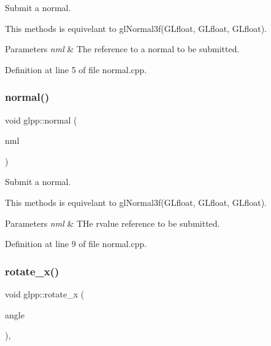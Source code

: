 Submit a normal. 

This methods is equivelant to gl\+Normal3f(\+G\+Lfloat, G\+Lfloat, G\+Lfloat).


\begin{DoxyParams}{Parameters}
{\em nml} & The reference to a normal to be submitted. \\
\hline
\end{DoxyParams}


Definition at line 5 of file normal.\+cpp.

\mbox{\label{namespaceglpp_a9a86b5d9e2e3e536e0c0f514017e943c}} 
\subsubsection{\texorpdfstring{normal()}{normal()}\hspace{0.1cm}{\footnotesize\ttfamily [2/2]}}
{\footnotesize\ttfamily void glpp\+::normal (\begin{DoxyParamCaption}\item[{const \hyperlink{namespaceglpp_a3fa7b207a8b7dba583fb22731a616d73}{float\+\_\+vector3} \&\&}]{nml }\end{DoxyParamCaption})\hspace{0.3cm}{\ttfamily [noexcept]}}



Submit a normal. 

This methods is equivelant to gl\+Normal3f(\+G\+Lfloat, G\+Lfloat, G\+Lfloat).


\begin{DoxyParams}{Parameters}
{\em nml} & T\+He rvalue reference to be submitted. \\
\hline
\end{DoxyParams}


Definition at line 9 of file normal.\+cpp.

\mbox{\label{namespaceglpp_af77d62a05c40cbf64fbf533e2de012f2}} 
\subsubsection{\texorpdfstring{rotate\+\_\+x()}{rotate\_x()}}
{\footnotesize\ttfamily void glpp\+::rotate\+\_\+x (\begin{DoxyParamCaption}\item[{register const G\+Lfloat}]{angle }\end{DoxyParamCaption})\hspace{0.3cm}{\ttfamily [inline]}, {\ttfamily [noexcept]}}



